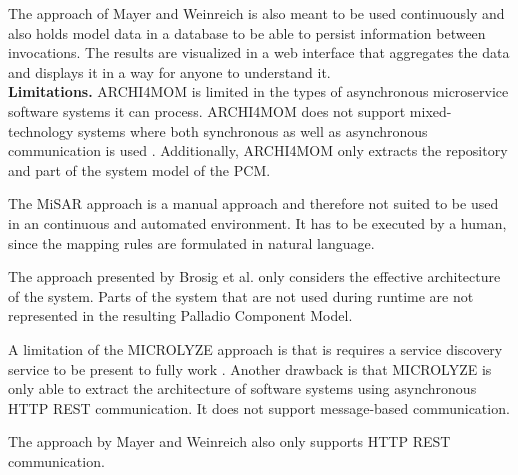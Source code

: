 The approach of Mayer and Weinreich is also meant to be used continuously and also holds model data in a database to be able to persist information between invocations.
The results are visualized in a web interface that aggregates the data and displays it in a way for anyone to understand it.
\\

\textbf{Limitations.}
ARCHI4MOM is limited in the types of asynchronous microservice software systems it can process.
ARCHI4MOM does not support mixed-technology systems where both synchronous as well as asynchronous communication is used \cite{Singh2022ARCHI4MOM}.
Additionally, ARCHI4MOM only extracts the repository and part of the system model of the PCM.

The MiSAR approach is a manual approach and therefore not suited to be used in an continuous and automated environment.
It has to be executed by a human, since the mapping rules are formulated in natural language. \cite{Alshuqayran2018MiSAR}

The approach presented by Brosig et al. only considers the effective architecture of the system.
Parts of the system that are not used during runtime are not represented in the resulting Palladio Component Model. \cite{Brosig2011}

A limitation of the MICROLYZE approach is that is requires a service discovery service to be present to fully work \cite{Kleehaus2018}.
Another drawback is that MICROLYZE is only able to extract the architecture of software systems using asynchronous HTTP REST communication.
It does not support message-based communication.

The approach by Mayer and Weinreich also only supports HTTP REST communication.


